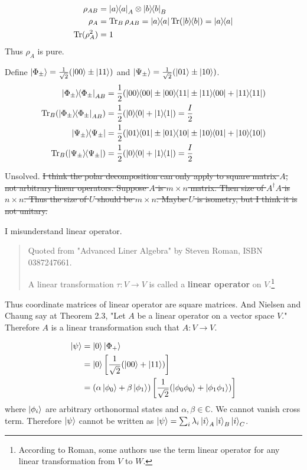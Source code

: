 \begin{align*}
	\rho_{AB} &= \ket{a}\hspace{-1mm} \bra{a}_A \otimes \ket{b}\hspace{-1mm} \bra{b}_B\\
	\rho_A &= \operatorname{Tr}_{B} \rho_{AB} = \ket{a}\hspace{-1mm} \bra{a} \operatorname{Tr} (\ket{b}\hspace{-1mm} \bra{b}) = \ket{a}\hspace{-1mm} \bra{a}\\
	\operatorname{Tr} (\rho_A^2) &= 1
\end{align*}
Thus $\rho_A$ is pure.


Define $\ket{\Phi_\pm} = \frac{1}{\sqrt{2}} (\ket{00} \pm \ket{11})$ and $\ket{\Psi_\pm} = \frac{1}{\sqrt{2}} (\ket{01} \pm \ket{10})$.
\begin{align*}
	\kb{\Phi_\pm}_{AB} &= \frac{1}{2} (\kb{00} \pm \kbt{00}{11} \pm \kbt{11}{00} + \kb{11})\\
	\Tr_B (\kb{\Phi_\pm}_{AB}) &= \frac{1}{2} (\kb{0} + \kb{1}) = \frac{I}{2}\\
%
	\kb{\Psi_\pm} &= \frac{1}{2} (\kb{01} \pm \kbt{01}{10} \pm \kbt{10}{01} + \kb{10})\\
	\Tr_B (\kb{\Psi_\pm}) &= \frac{1}{2} (\kb{0} + \kb{1}) = \frac{I}{2}
\end{align*}



Unsolved. \sout{I think the polar decomposition can only apply to square matrix $A$, not arbitrary linear operators.
Suppose $A$ is $m \times n$ matrix. Then size of $A^\dagger A$ is $n \times n$. Thus the size of $U$ should be $m \times n$.
Maybe $U$ is isometry, but I think it is not unitary.}

I misunderstand linear operator.
\begin{quote}
	Quoted from "Advanced Liner Algebra" by Steven Roman, ISBN 0387247661.

	A linear transformation $\tau : V \rightarrow V$ is called a \textbf{linear operator} on $V$.\footnote{According to Roman, some authors use the term linear operator for any linear transformation from $V$ to $W$.}
\end{quote}
Thus coordinate matrices of linear operator are square matrices. And Nielsen and Chaung say at Theorem 2.3, "Let $A$ be a linear operator on a vector space $V$." Therefore $A$ is a linear transformation such that $A : V \rightarrow V$.

\begin{align*}
	\ket{\psi}  &=  \ket{0}  \ket{\Phi_+}\\
		&= \ket{0} \left[\frac{1}{\sqrt{2}}(\ket{00} + \ket{11})\right]\\
		&= (\alpha \ket{\phi_0} + \beta \ket{\phi_1})  \left[\frac{1}{\sqrt{2}}(\ket{\phi_0 \phi_0} + \ket{\phi_1 \phi_1})\right]\\
\end{align*}
where $\ket{\phi_i}$ are arbitrary orthonormal states and $\alpha, \beta \in \mathds{C}$.
We cannot vanish cross term. Therefore $\ket{\psi}$ cannot be written as $\ket{\psi} = \sum_i \lambda_i \ket{i}_A \ket{i}_B \ket{i}_C$.



